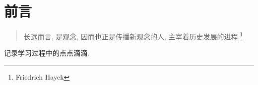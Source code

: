 \cleardoublepage
\setcounter{page}{1}

\chapter*{前言}
\begin{quote}
	\kaishu 长远而言, 是观念, 因而也正是传播新观念的人, 主宰着历史发展的进程.\footnote{Friedrich Hayek}
\end{quote}
记录学习过程中的点点滴滴.
